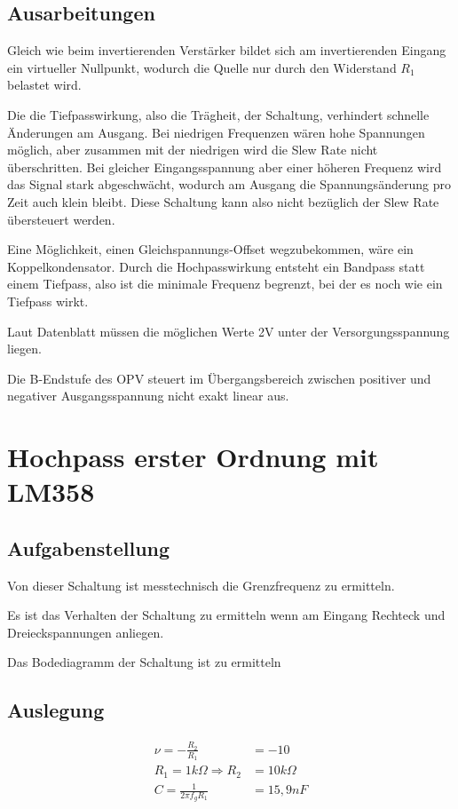 \subsection{Ausarbeitungen}
Gleich wie beim invertierenden Verstärker bildet sich am invertierenden Eingang ein virtueller Nullpunkt,
wodurch die Quelle nur durch den Widerstand $R_1$ belastet wird.

Die die Tiefpasswirkung, also die Trägheit, der Schaltung, verhindert schnelle Änderungen am Ausgang. Bei
niedrigen Frequenzen wären hohe Spannungen möglich, aber zusammen mit der niedrigen wird die Slew Rate
nicht überschritten. Bei gleicher Eingangsspannung aber einer höheren Frequenz wird das Signal stark
abgeschwächt, wodurch am Ausgang die Spannungsänderung pro Zeit auch klein bleibt. Diese Schaltung kann also
nicht bezüglich der Slew Rate übersteuert werden.

Eine Möglichkeit, einen Gleichspannungs-Offset wegzubekommen, wäre ein Koppelkondensator. Durch die
Hochpasswirkung entsteht ein Bandpass statt einem Tiefpass, also ist die minimale Frequenz begrenzt, bei der es
noch wie ein Tiefpass wirkt. 

Laut Datenblatt müssen die möglichen Werte 2V unter der Versorgungsspannung liegen.

Die B-Endstufe des OPV steuert im Übergangsbereich zwischen positiver und negativer Ausgangsspannung
nicht exakt linear aus.
\section{Hochpass erster Ordnung mit LM358}
\subsection{Aufgabenstellung}
Von dieser Schaltung ist messtechnisch die Grenzfrequenz zu ermitteln.

Es ist das Verhalten der Schaltung zu ermitteln wenn am Eingang Rechteck und Dreieckspannungen anliegen.

Das Bodediagramm der Schaltung ist zu ermitteln

\subsection{Auslegung}
\begin{align}
    \nu = -\frac{R_2}{R_1} &= -10\\
    R_1 = 1k\Omega \Rightarrow R_2 &= 10k\Omega\\
    C = \frac{1}{2\pi f_g R_1} &= 15,9nF
\end{align}
